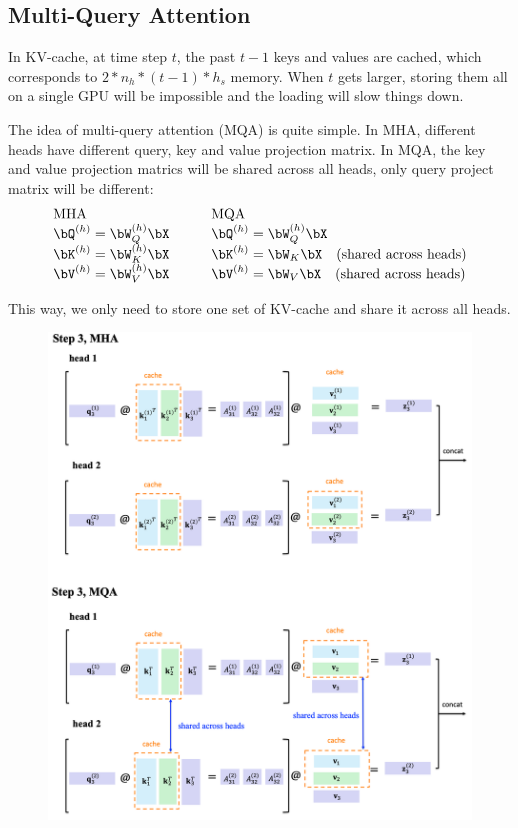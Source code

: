 \documentclass{article}
\begin{document}
\subsection{Multi-Query Attention}
In KV-cache, at time step $t$, the past $t-1$ keys and values are cached, which corresponds to $2 * n_h * (t-1) * h_s$ memory. 
When $t$ gets larger, storing them all on a single GPU will be impossible and the loading will slow things down.

The idea of multi-query attention (MQA) is quite simple. 
In MHA, different heads have different query, key and value projection matrix.
In MQA, the key and value projection matrics will be shared across all heads, only query project matrix will be different:
\[
\begin{array}{ll}
   \text{MHA} & \qquad \text{MQA} \\
  \bQ^{(h)} = \bW_Q^{(h)} \bX & \qquad  \bQ^{(h)} = \bW_Q^{(h)} \bX \\
  \bK^{(h)} = \bW_K^{(h)} \bX & \qquad  \bK^{(h)} = \bW_K \bX \quad \text{(shared across heads)} \\
  \bV^{(h)} = \bW_V^{(h)} \bX & \qquad  \bV^{(h)} = \bW_V \bX \quad \text{(shared across heads)}
\end{array}
\]

This way, we only need to store one set of KV-cache and share it across all heads.
\begin{figure}[!h]
	\centering
	\includegraphics[scale=0.43]{imgs/MQA.png}
\end{figure}
\end{document}
